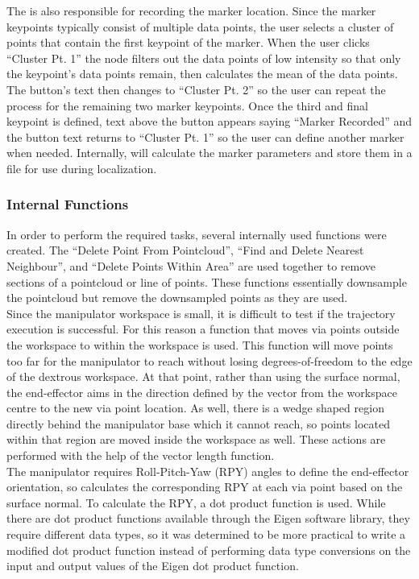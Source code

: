 The  is also responsible for recording the marker location. Since the marker keypoints typically consist of multiple data points, the user selects a cluster of points that contain the first keypoint of the marker. When the user clicks ``Cluster Pt. 1''  the node filters out the data points of low intensity so that only the keypoint's data points remain, then calculates the mean of the data points. The button's text then changes to ``Cluster Pt. 2'' so the user can repeat the process for the remaining two marker keypoints. Once the third and final keypoint is defined, text above the button appears saying ``Marker Recorded'' and the button text returns to ``Cluster Pt. 1'' so the user can define another marker when needed. Internally,  will calculate the marker parameters and store them in a file for use during localization.\\
\subsubsection{Internal Functions}
In order to perform the required tasks, several internally used functions were created. The ``Delete Point From Pointcloud'', ``Find and Delete Nearest Neighbour'', and ``Delete Points Within Area'' are used together to remove sections of a pointcloud or line of points. These functions essentially downsample the pointcloud but remove the downsampled points as they are used.\\

Since the manipulator workspace is small, it is difficult to test if the trajectory execution is successful. For this reason a function that moves via points outside the workspace to within the workspace is used. This function will move points too far for the manipulator to reach without losing degrees-of-freedom to the edge of the dextrous workspace. At that point, rather than using the surface normal, the end-effector aims in the direction defined by the vector from the workspace centre to the new via point location. As well, there is a wedge shaped region directly behind the manipulator base which it cannot reach, so points located within that region are moved inside the workspace as well. These actions are performed with the help of the vector length function.\\

The manipulator requires Roll-Pitch-Yaw (RPY) angles to define the end-effector orientation, so  calculates the corresponding RPY at each via point based on the surface normal. To calculate the RPY, a dot product function is used. While there are dot product functions available through the Eigen software library, they require different data types, so it was determined to be more practical to write a modified dot product function instead of performing data type conversions on the input and output values of the Eigen dot product function.\\

